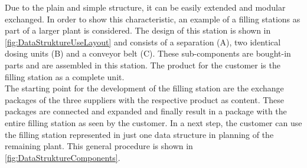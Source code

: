     Due to the plain and simple structure, it can be easily extended and modular exchanged. In order to show this characteristic, an example of a filling stations as part of a larger plant is considered. The design of this station is shown in \autoref{fig:DataStruktureUseLayout} and consists of a separation (A), two identical dosing units (B) and a conveyor belt (C). These sub-components are bought-in parts and are assembled in this station. The product for the customer is the filling station as a complete unit.  \\
    
    The starting point for the development of the filling station are the exchange packages of the three suppliers with the respective product as content. These packages are connected and expanded and finally result in a package with the entire filling station as seen by the customer. In a next step, the customer can use the filling station represented in just one data structure in planning of the remaining plant. This general procedure is shown in \autoref{fig:DataStruktureComponents}.

